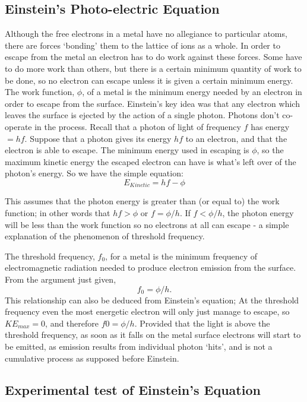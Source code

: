 \documentclass[a4paper,12pt]{book}
\begin{document}
\subsection{Einstein's Photo-electric Equation}
Although the free electrons in a metal have no allegiance to particular atoms, there are forces `bonding' them to the lattice of ions as a whole. In order to escape from the metal an electron has to do work against these forces. Some have to do more work than others, but there is a certain minimum quantity of work to be done, so no electron can escape unless it is given a certain minimum energy.
The work function, $\phi$, of a metal is the minimum energy needed by an electron in order to escape from the surface. 
Einstein's key idea was that any electron which leaves the surface is ejected by the action of a single photon. Photons don't co-operate in the process.
Recall that a photon of light of frequency $f$ has energy $= hf$. 
Suppose that a photon gives its energy $hf$ to an electron, and that the electron is able to escape. The minimum energy used in escaping is $\phi$, so the maximum kinetic energy the escaped electron can have is what's left over of the photon's energy. So we have the simple equation:
\[ E_{Kinetic} =hf - \phi \]

This assumes that the photon energy is greater than (or equal to) the work function; in other words that  $hf>\phi$ or $f=\phi/h$.
If  $f < \phi/h$, the photon energy will be less than the work function so no electrons at all can escape - a simple explanation of the phenomenon of threshold frequency.
 
The threshold frequency, $f_0$, for a metal is the minimum frequency of electromagnetic radiation needed to produce electron emission from the surface.
From the argument just given, 
\[f_{0} =  \phi/ h.\]
This relationship can also be deduced from Einstein's equation; At the threshold frequency even the most energetic electron will only just manage to escape, so $KE_{max} =  0$, and therefore     $f0 = \phi/h$.
Provided that the light is above the threshold frequency, as soon as it falls on the metal surface electrons will start to be emitted, as emission results from individual photon `hits', and is not a cumulative process as supposed before Einstein.

\subsection{Experimental test of Einstein's Equation}
\end{document}
